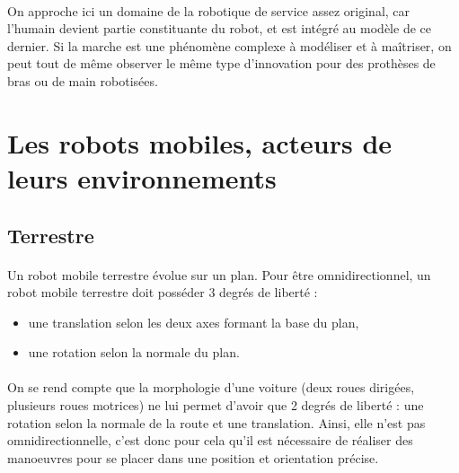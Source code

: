 \documentclass[a4paper,10pt]{article}
\begin{document}
                \paragraph{}
                    On approche ici un domaine de la robotique de service assez original, 
                    car l'humain devient partie constituante du robot, et est intégré 
                    au modèle de ce dernier. Si la marche est une phénomène complexe 
                    à modéliser et à maîtriser, on peut tout de même observer le même 
                    type d'innovation pour des prothèses de bras ou de main robotisées.
                    
        
    \section{Les robots mobiles, acteurs de leurs environnements}
        \subsection{Terrestre}
            \paragraph{}
                Un robot mobile terrestre évolue sur un plan. 
                Pour être omnidirectionnel, un robot mobile terrestre 
                doit posséder 3 degrés de liberté : 
                \begin{itemize}
                    \item une translation selon les deux axes formant la base
                    du plan, 
                    \item une rotation selon la normale du plan. 
                \end{itemize}
                
            \paragraph{}
                On se rend compte que la morphologie d'une voiture 
                (deux roues dirigées, plusieurs roues motrices) ne lui permet 
                d'avoir que 2 degrés de liberté : une rotation selon 
                la normale de la route et une translation. Ainsi, elle n'est 
                pas omnidirectionnelle, c'est donc pour cela qu'il est nécessaire 
                de réaliser des manoeuvres pour se placer dans une position 
                et orientation précise. 
                
\end{document}
